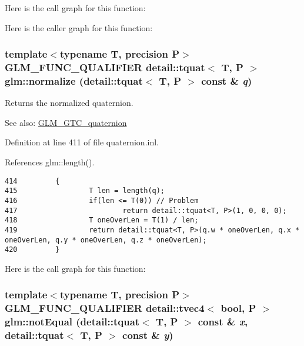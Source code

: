 Here is the call graph for this function:

Here is the caller graph for this function:\hypertarget{group__gtc__quaternion_g396b587a47d7e611895b2c95892a2e17}{
\subsubsection[normalize]{\setlength{\rightskip}{0pt plus 5cm}template$<$typename T, precision P$>$ GLM\_\-FUNC\_\-QUALIFIER detail::tquat$<$ T, P $>$ glm::normalize (detail::tquat$<$ T, P $>$ const \& {\em q})}}
\label{group__gtc__quaternion_g396b587a47d7e611895b2c95892a2e17}


Returns the normalized quaternion.

\begin{Desc}
\item[See also:]\hyperlink{group__gtc__quaternion}{GLM\_\-GTC\_\-quaternion} \end{Desc}


Definition at line 411 of file quaternion.inl.

References glm::length().

\begin{Code}\begin{verbatim}414         {
415                 T len = length(q);
416                 if(len <= T(0)) // Problem
417                         return detail::tquat<T, P>(1, 0, 0, 0);
418                 T oneOverLen = T(1) / len;
419                 return detail::tquat<T, P>(q.w * oneOverLen, q.x * oneOverLen, q.y * oneOverLen, q.z * oneOverLen);
420         }
\end{verbatim}
\end{Code}




Here is the call graph for this function:\hypertarget{group__gtc__quaternion_g5299d50f9c7692d388f1275cff4e89ce}{
\subsubsection[notEqual]{\setlength{\rightskip}{0pt plus 5cm}template$<$typename T, precision P$>$ GLM\_\-FUNC\_\-QUALIFIER detail::tvec4$<$ bool, P $>$ glm::notEqual (detail::tquat$<$ T, P $>$ const \& {\em x}, \/  detail::tquat$<$ T, P $>$ const \& {\em y})}}
\label{group__gtc__quaternion_g5299d50f9c7692d388f1275cff4e89ce}


